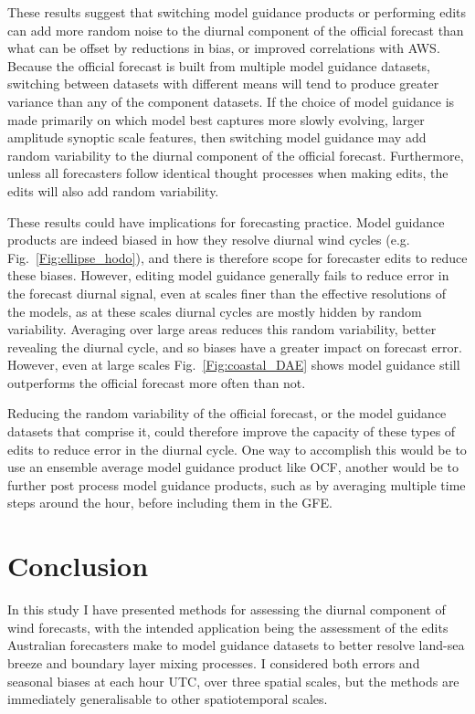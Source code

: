 \documentclass{ametsoc}
\begin{document}
These results suggest that switching model guidance products or performing edits can add more random noise to the diurnal component of the official forecast than what can be offset by reductions in bias, or improved correlations with AWS. Because the official forecast is built from multiple model guidance datasets, switching between datasets with different means will tend to produce greater variance than any of the component datasets. If the choice of model guidance is made primarily on which model best captures more slowly evolving, larger amplitude synoptic scale features, then switching model guidance may add random variability to the diurnal component of the official forecast. Furthermore, unless all forecasters follow identical thought processes when making edits, the edits will also add random variability. 

These results could have implications for forecasting practice. Model guidance products are indeed biased in how they resolve diurnal wind cycles (e.g. Fig.~\ref{Fig:ellipse_hodo}), and there is therefore scope for forecaster edits to reduce these biases. However, editing model guidance generally fails to reduce error in the forecast diurnal signal, even at scales finer than the effective resolutions of the models, as at these scales diurnal cycles are mostly hidden by random variability. Averaging over large areas reduces this random variability, better revealing the diurnal cycle, and so biases have a greater impact on forecast error. However, even at large scales Fig.~\ref{Fig:coastal_DAE} shows model guidance still outperforms the official forecast more often than not.

Reducing the random variability of the official forecast, or the model guidance datasets that comprise it, could therefore improve the capacity of these types of edits to reduce error in the diurnal cycle. One way to accomplish this would be to use an ensemble average model guidance product like OCF, another would be to further post process model guidance products, such as by averaging multiple time steps around the hour, before including them in the GFE.

\section{Conclusion}
\label{Sec:Conclusion}
In this study I have presented methods for assessing the diurnal component of wind forecasts, with the intended application being the assessment of the edits Australian forecasters make to model guidance datasets to better resolve land-sea breeze and boundary layer mixing processes. I considered both errors and seasonal biases at each hour UTC, over three spatial scales, but the methods are immediately generalisable to other spatiotemporal scales. 
\end{document}
